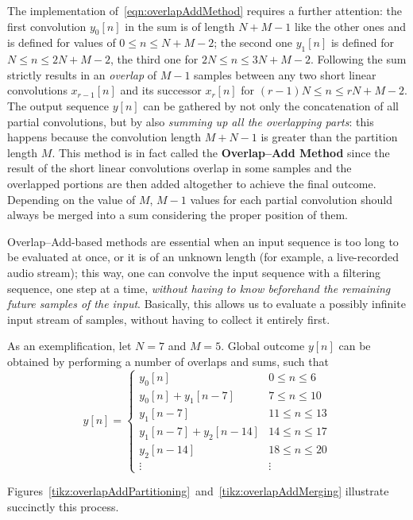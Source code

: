 \documentclass[\documentfontsize, twocolumn]{\classname}
\begin{document}
The implementation of~\ref{eqn:overlapAddMethod} requires a further attention: the first convolution $y_0[n]$ in the sum is of length $N + M - 1$ like the other ones and is defined for values of $0 \leq n \leq N + M - 2$; the second one $y_1[n]$ is defined for $N \leq n \leq 2N + M - 2$, the third one for $2N \leq n \leq 3N + M - 2$. Following the sum strictly results in an \emph{overlap} of $M - 1$ samples between any two short linear convolutions $x_{r-1}[n]$ and its successor $x_r[n]$ for $(r-1)N \leq n \leq rN + M - 2$. The output sequence $y[n]$ can be gathered by not only the concatenation of all partial convolutions, but by also \emph{summing up all the overlapping parts}: this happens because the convolution length $M + N - 1$ is greater than the partition length $M$. This method is in fact called the \textbf{Overlap--Add Method} since the result of the short linear convolutions overlap in some samples and the overlapped portions are then added altogether to achieve the final outcome. Depending on the value of $M$, $M-1$ values for each partial convolution should always be merged into a sum considering the proper position of them.

Overlap--Add-based methods are essential when an input sequence is too long to be evaluated at once, or it is of an unknown length (for example, a live-recorded audio stream); this way, one can convolve the input sequence with a filtering sequence, one step at a time, \emph{without having to know beforehand the remaining future samples of the input}. Basically, this allows us to evaluate a possibly infinite input stream of samples, without having to collect it entirely first.

As an exemplification, let $N = 7$ and $M = 5$. Global outcome $y[n]$ can be obtained by performing a number of overlaps and sums, such that
\[
    y[n] =
    \left\{
        \begin{array}{ll}
            y_0[n] & 0 \leq n \leq 6\\
            y_0[n] + y_1[n - 7] & 7 \leq n \leq 10\\
            y_1[n - 7] & 11 \leq n \leq 13\\
            y_1[n - 7] + y_2[n - 14] & 14 \leq n \leq 17\\
            y_2[n - 14] & 18 \leq n \leq 20\\
            \vdots & \vdots
        \end{array}
    \right.
\]

Figures~\ref{tikz:overlapAddPartitioning}~and~\ref{tikz:overlapAddMerging} illustrate succinctly this process.
\end{document}
